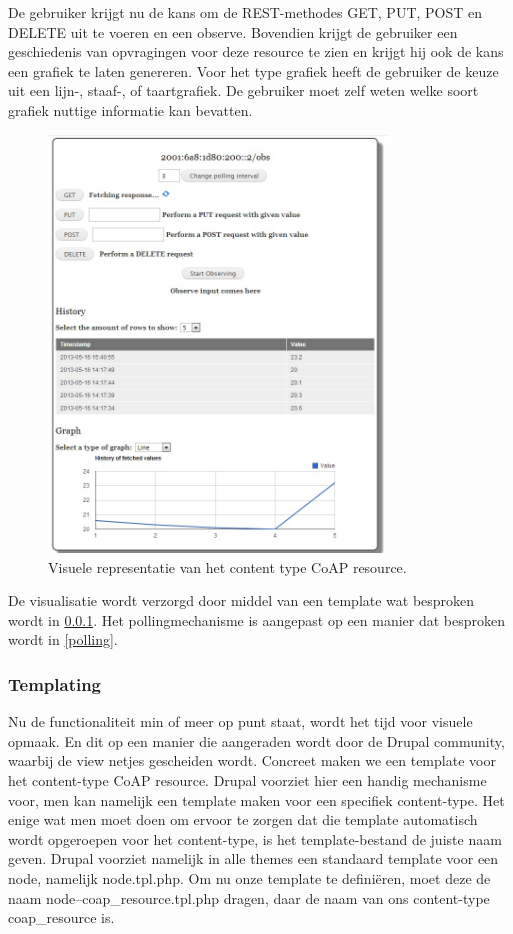 De gebruiker krijgt nu de kans om de REST-methodes  GET, PUT, POST en DELETE uit te voeren en een observe. Bovendien krijgt de gebruiker een geschiedenis van opvragingen voor deze resource te zien en krijgt hij ook de kans een grafiek te laten genereren. Voor het type grafiek heeft de gebruiker de keuze uit een lijn-, staaf-, of taartgrafiek. De gebruiker moet zelf weten welke soort grafiek nuttige informatie kan bevatten.
\begin{figure}[h!]
\centering
\includegraphics[width=0.8\textwidth]{fig/coap_resource}
\caption{Visuele representatie van het content type CoAP resource.}
\label{fig:coapResource}
\end{figure}
De visualisatie wordt verzorgd door middel van een template wat besproken wordt in \ref{templating}. Het pollingmechanisme is aangepast op een manier dat besproken wordt in \ref{polling}.

\subsubsection{Templating}\label{templating}
Nu de functionaliteit min of meer op punt staat, wordt het tijd voor visuele opmaak. En dit op een manier die aangeraden wordt door de Drupal community, waarbij de view netjes gescheiden wordt. Concreet maken we een template voor het content-type CoAP resource. Drupal voorziet hier een handig mechanisme voor, men kan namelijk een template maken voor een specifiek content-type. Het enige wat men moet doen om ervoor te zorgen dat die template automatisch wordt opgeroepen voor het content-type, is het template-bestand de juiste naam geven. Drupal voorziet namelijk in alle themes een standaard template voor een node, namelijk node.tpl.php. Om nu onze template te defini\"{e}ren, moet deze de naam node--coap\_resource.tpl.php dragen, daar de naam van ons content-type coap\_resource is.\\

